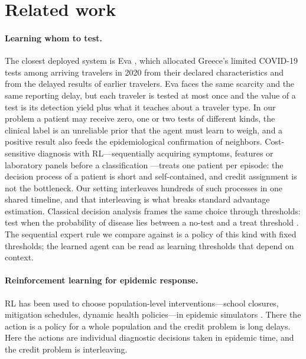 \documentclass[11pt,a4paper]{article}
\begin{document}
\section{Related work}
\label{sec:related}

\paragraph{Learning whom to test.} The closest deployed system is Eva \cite{bastani2021eva}, which allocated Greece's limited COVID-19 tests among arriving travelers in 2020 from their declared characteristics and from the delayed results of earlier travelers. Eva faces the same scarcity and the same reporting delay, but each traveler is tested at most once and the value of a test is its detection yield plus what it teaches about a traveler type. In our problem a patient may receive zero, one or two tests of different kinds, the clinical label is an unreliable prior that the agent must learn to weigh, and a positive result also feeds the epidemiological confirmation of neighbors. Cost-sensitive diagnosis with RL---sequentially acquiring symptoms, features or laboratory panels before a classification \cite{peng2018refuel, shim2018afa, yu_deep_2023}---treats one patient per episode: the decision process of a patient is short and self-contained, and credit assignment is not the bottleneck. Our setting interleaves hundreds of such processes in one shared timeline, and that interleaving is what breaks standard advantage estimation. Classical decision analysis frames the same choice through thresholds: test when the probability of disease lies between a no-test and a treat threshold \cite{pauker1980threshold}. The sequential expert rule we compare against is a policy of this kind with fixed thresholds; the learned agent can be read as learning thresholds that depend on context.

\paragraph{Reinforcement learning for epidemic response.} RL has been used to choose population-level interventions---school closures, mitigation schedules, dynamic health policies---in epidemic simulators \cite{libin2021epidemic, yaesoubi_generalized_2011}. There the action is a policy for a whole population and the credit problem is long delays. Here the actions are individual diagnostic decisions taken in epidemic time, and the credit problem is interleaving.
\end{document}
